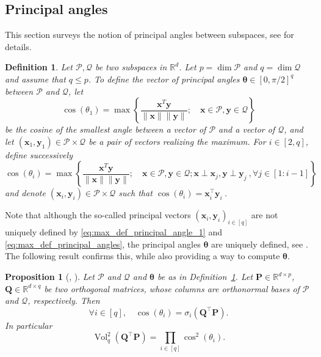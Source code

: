 \documentclass[twoside,11pt]{book}
\newtheorem{proposition}{Proposition}
\newtheorem{definition}{Definition}
\numberwithin{theorem}{chapter}
\numberwithin{definition}{chapter}
\numberwithin{proposition}{chapter}
\numberwithin{corollary}{chapter}
\numberwithin{example}{chapter}
\numberwithin{lemma}{chapter}
\numberwithin{assumption}{chapter}
\DeclareMathOperator{\Vol}{Vol}
\DeclareMathOperator{\Tran}{\intercal}
\begin{document}
\subsection{Principal angles}
This section surveys the notion of principal angles between subspaces, see \cite[Section 6.4.3]{GoVa96} for details.
\begin{definition}
  \label{d:angles}
Let $\mathcal{P},\mathcal{Q}$ be two subspaces in $\mathbb{R}^{d}$. Let $p= \dim\mathcal{P}$ and $q = \dim\mathcal{Q}$ and assume that $q \leq p$. To define the vector of principal angles $\bm{\theta} \in [0,\pi/2]^{q}$ between $\mathcal{P}$ and $\mathcal{Q}$, let
\begin{equation}\label{eq:max_def_principal_angle_1}
 \cos(\theta_{1}) = \max \left\{ \frac{\bm{x}^{T}\bm{y}}{\|\bm{x}\|\|\bm{y}\|}; \quad \bm{x} \in \mathcal{P}, \bm{y} \in \mathcal{Q} \right\}
\end{equation}
be the cosine of the smallest angle between a vector of $\mathcal{P}$ and a vector of $\mathcal{Q}$, and let $(\bm{x}_{1},\bm{y}_{1}) \in \mathcal{P}\times \mathcal{Q}$ be a pair of vectors realizing the maximum. For $i \in [2,q]$, define successively
\begin{equation}\label{eq:max_def_principal_angles}
 \cos(\theta_{i}) = \max \left\{\frac{\bm{x}^{T}\bm{y}}{\|\bm{x}\|\|\bm{y}\|}; \quad \bm{x} \in \mathcal{P}, \bm{y} \in \mathcal{Q}; \bm{x} \perp \bm{x}_{j}, \bm{y} \perp \bm{y}_{j}\:, \forall j \in [1:i-1] \right\}
\end{equation}
and denote $(\bm{x}_{i},\bm{y}_{i}) \in \mathcal{P}\times\mathcal{Q}$ such that $\cos(\theta_{i}) = \bm{x}_{i}^{\Tran}\bm{y}_{i} \:$.
\end{definition}
Note that although the so-called principal vectors $(\bm{x}_{i},\bm{y}_{i})_{i \in [q]}$
are not uniquely defined by \eqref{eq:max_def_principal_angle_1} and \eqref{eq:max_def_principal_angles}, the principal angles $\bm{\theta}$ are uniquely defined, see \citep{BjGo73}. The following result confirms this, while also providing a way to compute $\bm{\theta}$.
\begin{proposition}[\citealp{BjGo73}, \citealp{Ben92}]
  \label{principal_angles_theorem_1}
Let $\mathcal{P}$ and $\mathcal{Q}$ and $\bm{\theta}$ be as in Definition~\ref{d:angles}. Let $\bm{P} \in \mathbb{R}^{d \times p}$, $\bm{Q} \in \mathbb{R}^{d \times q}$ be two orthogonal matrices, whose columns are orthonormal bases of $\mathcal{P}$ and $\mathcal{Q}$, respectively. Then
\begin{equation}
 \forall i \in [q], \quad \cos(\theta_{i}) =\sigma_i(\bm{Q}^{\Tran}\bm{P}).
\end{equation}
In particular
\begin{equation}\label{principal_angles_formula}
\Vol_{q}^{2}(\bm{Q}^{\Tran}\bm{P}) = \prod\limits_{i \in [q]} \cos^{2}(\theta_{i}).
\end{equation}
\end{proposition}
\end{document}
